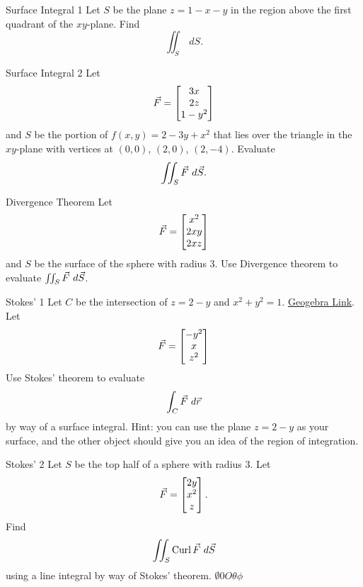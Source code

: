 \begin{revex}{Surface Integral 1}
Let $S$ be the plane $z=1-x-y$ in the region above the first quadrant of the $xy$-plane. Find $$\iint_S \ dS.$$
\end{revex}

\begin{revex}{Surface Integral 2}
Let $$\vec{F}=\begin{bmatrix}3x\\2z\\1-y^2\end{bmatrix}$$ and $S$ be the portion of $f(x,y)=2-3y+x^2$ that lies over the triangle in the $xy$-plane with vertices at $(0,0)$, $(2,0)$, $(2,-4)$. Evaluate $$\iint_S \vec{F}\ d\vec{S}. $$
\end{revex}

\begin{revex}{Divergence Theorem}
Let $$\vec{F}=\begin{bmatrix}x^2\\2xy\\2xz\end{bmatrix}$$ and $S$ be the surface of the sphere with radius 3. Use Divergence theorem to evaluate $\iint_S \vec{F} \ d\vec{S}$.
\end{revex}

\begin{revex}{Stokes' 1}
Let $C$ be the intersection of $z=2-y$ and $x^2+y^2=1$. \href{https://www.geogebra.org/3d/dcdcjckt}{Geogebra Link}. Let $$\vec{F}=\begin{bmatrix}-y^2\\x\\z^2\end{bmatrix} $$ Use Stokes' theorem to evaluate $$\int_C \vcF \ d\vcr $$ by way of a surface integral. Hint: you can use the plane $z=2-y$ as your surface, and the other object should give you an idea of the region of integration.
\end{revex}

\begin{revex}{Stokes' 2}
Let $S$ be the top half of a sphere with radius 3. Let $$\vec{F}=\begin{bmatrix}2y\\x^2\\z\end{bmatrix}.$$ Find $$\iint_S \operatorname{Curl}\vec{F} \ d \vec{S} $$ using a line integral by way of Stokes' theorem. $\emptyset 0 O \theta \phi$
\end{revex}
